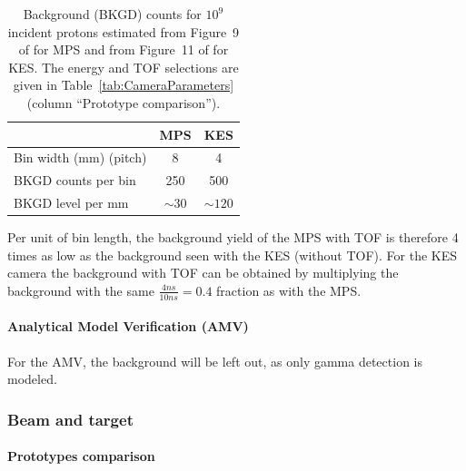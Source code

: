 \documentclass[a4paper,english,12pt]{article}
\newcommand{\qq}[1]{\enquote{#1}}
\begin{document}
\begin{table}[h]
\centering		
\begin{tabular}{lcc}
	\toprule
													& MPS			& KES \\
	\midrule
	Bin width (mm) (pitch)	& 8				& 4 \\
	BKGD counts per bin			& 250			& 500 \\
	BKGD level per mm				& $\sim30$& $\sim120$ \\
	\bottomrule
\end{tabular}		
\caption{Background (BKGD) counts for $10^9$ incident protons estimated from Figure~9 of \cite{Pinto2014a} for MPS and from Figure~11 of \cite{Perali2014} for KES. The energy and TOF selections are given in Table~\ref{tab:CameraParameters} (column \qq{Prototype comparison}).}
\label{tab:BKGD}
\end{table}		


Per unit of bin length, the background yield of the MPS with TOF is therefore 4 times as low as the background seen with the KES (without TOF). For the KES camera the background with TOF can be obtained by multiplying the background with the same $\frac{4 ns}{10 ns} = 0.4$ fraction as with the MPS. 

\paragraph{Analytical Model Verification (AMV)}

For the AMV, the background will be left out, as only gamma detection is modeled.

\subsubsection{Beam and target}

\paragraph{Prototypes comparison}
\end{document}

